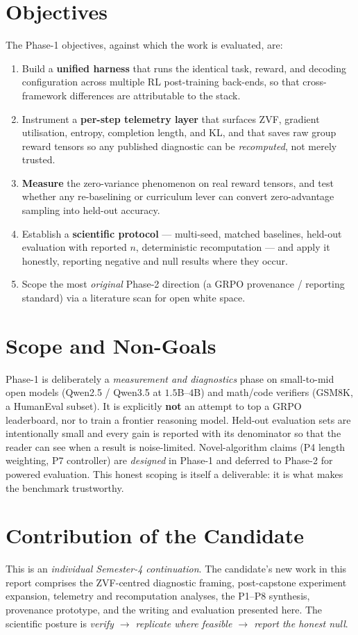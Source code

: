 \section{Objectives}
The Phase-1 objectives, against which the work is evaluated, are:
\begin{enumerate}[leftmargin=1.6em,itemsep=2pt]
  \item Build a \textbf{unified harness} that runs the identical task, reward, and
  decoding configuration across multiple RL post-training back-ends, so that
  cross-framework differences are attributable to the stack.
  \item Instrument a \textbf{per-step telemetry layer} that surfaces ZVF, gradient
  utilisation, entropy, completion length, and KL, and that saves raw group reward
  tensors so any published diagnostic can be \emph{recomputed}, not merely trusted.
  \item \textbf{Measure} the zero-variance phenomenon on real reward tensors, and
  test whether any re-baselining or curriculum lever can convert zero-advantage
  sampling into held-out accuracy.
  \item Establish a \textbf{scientific protocol} --- multi-seed, matched baselines,
  held-out evaluation with reported $n$, deterministic recomputation --- and apply it
  honestly, reporting negative and null results where they occur.
  \item Scope the most \emph{original} Phase-2 direction (a GRPO provenance /
  reporting standard) via a literature scan for open white space.
\end{enumerate}

\section{Scope and Non-Goals}
Phase-1 is deliberately a \emph{measurement and diagnostics} phase on small-to-mid
open models (Qwen2.5 / Qwen3.5 at $1.5$B--$4$B) and math/code verifiers (GSM8K,
a HumanEval subset). It is explicitly \textbf{not} an attempt to top a GRPO
leaderboard, nor to train a frontier reasoning model. Held-out evaluation sets are
intentionally small and every gain is reported with its denominator so that the
reader can see when a result is noise-limited. Novel-algorithm claims (P4 length
weighting, P7 controller) are \emph{designed} in Phase-1 and deferred to Phase-2
for powered evaluation. This honest scoping is itself a deliverable: it is what
makes the benchmark trustworthy.

\section{Contribution of the Candidate}
\label{sec:contribution}
This is an \emph{individual Semester-4 continuation}. The candidate's new work in
this report comprises the ZVF-centred diagnostic framing, post-capstone experiment
expansion, telemetry and recomputation analyses, the P1--P8 synthesis, provenance
prototype, and the writing and evaluation presented here. The scientific posture is
\emph{verify $\rightarrow$ replicate where feasible $\rightarrow$ report the honest
null}.

